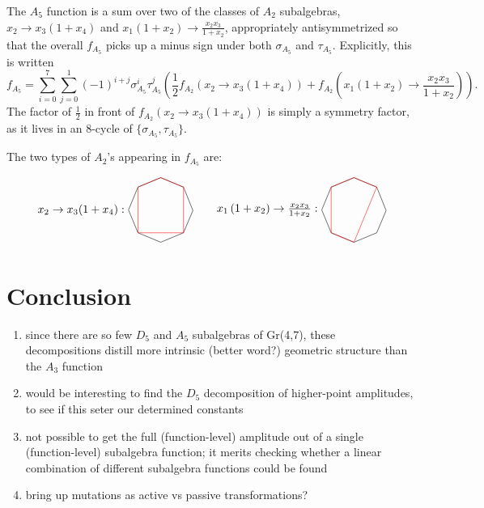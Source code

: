 \documentclass[11pt]{article}
\def\drawOctagon{
\coordinate (P1) at (45:1);
\coordinate (P2) at (90:1);
\coordinate (P3) at (135:1);
\coordinate (P4) at (180:1);
\coordinate (P5) at (225:1);
\coordinate (P6) at (270:1);
\coordinate (P7) at (315:1);
\coordinate (P8) at (359:1);
\draw (P1) -- (P2) -- (P3) -- (P4) -- (P5) -- (P6) -- (P7) -- (P8) -- cycle;
}
\begin{document}
The $A_5$ function is a sum over two of the classes of $A_2$ subalgebras, $x_2\to x_3\left(1+x_4\right)$ and $x_1 \left(1+x_2\right)\to \frac{x_2x_3}{1+x_2}$, appropriately antisymmetrized so that the overall $f_{A_5}$ picks up a minus sign under both $\sigma_{A_5}$ and $\tau_{A_5}$. Explicitly, this is written
\begin{equation}
	f_{A_5} = \sum_{i=0}^7\sum_{j=0}^1(-1)^{i+j}\sigma_{A_5}^i\tau_{A_5}^j\left(\frac12 f_{A_2}\left(x_2\to x_3\left(1+x_4\right)\right) + f_{A_2}\left(x_1 \left(1+x_2\right)\to \frac{x_2x_3}{1+x_2}\right)\right).
\end{equation}
The factor of $\frac12$ in front of $f_{A_2}\left(x_2\to x_3\left(1+x_4\right)\right)$ is simply a symmetry factor, as it lives in an 8-cycle of $\{\sigma_{A_5},\tau_{A_5}\}$.

The two types of $A_2$'s appearing in $f_{A_5}$ are:

\begin{equation}
\begin{tikzpicture}
\drawOctagon
\draw[color=red] (P1) -- (P2) -- (P3) -- (P5) -- (P7) -- cycle;
\node[anchor=east] at (-1,0) (a) {$x_2 \to x_3(1+x_4):$};
\begin{scope}[xshift=6cm]
\drawOctagon
\node[anchor=east] at (-1,0) (a) {$x_1 \left(1+x_2\right)\to \frac{x_2x_3}{1+x_2}:$};
\draw[color=red] (P1) -- (P2) -- (P3) -- (P5) -- (P6) -- cycle;
\end{scope}
\end{tikzpicture}
\end{equation}

\section{Conclusion}

\begin{enumerate}
\item since there are so few $D_5$ and $A_5$ subalgebras of Gr(4,7), these decompositions distill more intrinsic (better word?) geometric structure than the $A_3$ function 
\item would be interesting to find the $D_5$ decomposition of higher-point amplitudes, to see if this seter our determined constants
\item not possible to get the full (function-level) amplitude out of a single (function-level) subalgebra function; it merits checking whether a linear combination of different subalgebra functions could be found
\item bring up mutations as active vs passive transformations?
\end{enumerate}
\end{document}
